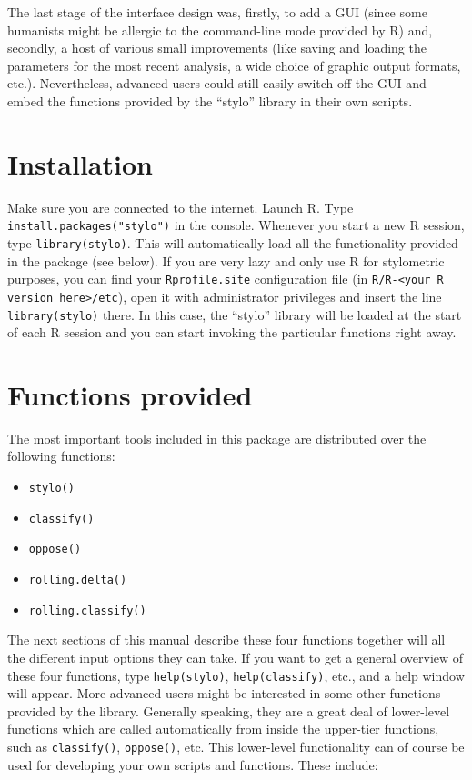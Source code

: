 \documentclass[11pt,a4paper]{article}
\def\code#1{{\tt #1}}
\begin{document}
The last stage of the interface design was, firstly, to add a GUI
(since some humanists might be allergic to the command-line mode provided
by R) and, secondly, a host of various small improvements (like saving
and loading the parameters for the most recent analysis, a wide choice
of graphic output formats, etc.). Nevertheless, advanced users could
still easily switch off the GUI and embed the functions provided by
the ``stylo'' library in their own scripts.


\section{Installation}

Make sure you are connected to the internet. Launch R. Type \code{install.packages("stylo")}
in the console. Whenever you start a new R session, type \code{library(stylo)}.
This will automatically load all the functionality provided in the
package (see below). If you are very lazy and only use R for stylometric
purposes, you can find your \code{Rprofile.site} configuration file 
(in \code{R/R-<your R version here>/etc}), open it with administrator privileges
and insert the line \code{library(stylo)} there. In this case, the
``stylo'' library will be loaded at the start of each R session and you
can start invoking the particular functions right away.


\section{Functions provided}

The most important tools included in this package are distributed
over the following functions:

\begin{itemize}
  \item \code{stylo()}
  \item \code{classify()} 
  \item \code{oppose()} 
  \item \code{rolling.delta()}
  \item \code{rolling.classify()}
\end{itemize}

The next sections of this manual describe these four functions together
will all the different input options they can take. If you want to
get a general overview of these four functions, type \code{help(stylo)},
\code{help(classify)}, etc., and a help window will appear. More
advanced users might be interested in some other functions
provided by the library. Generally speaking, they are a great deal
of lower-level functions which are called automatically from inside
the upper-tier functions, such as \code{classify()}, \code{oppose()},
etc. This lower-level functionality can of course be used for developing
your own scripts and functions. These include:
\end{document}
